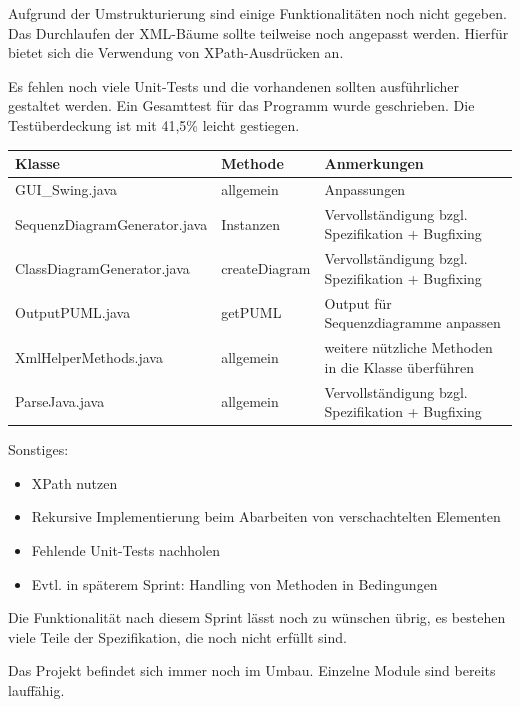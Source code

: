 Aufgrund der Umstrukturierung sind einige Funktionalitäten noch nicht gegeben. Das Durchlaufen der XML-Bäume sollte teilweise noch angepasst werden. Hierfür bietet sich die Verwendung von XPath-Ausdrücken an.
\nsecend%

Es fehlen noch viele Unit-Tests und die vorhandenen sollten ausführlicher gestaltet werden.
Ein Gesamttest für das Programm wurde geschrieben.
Die Testüberdeckung ist mit 41,5\% leicht gestiegen.
\nsecend%

\begin{table}[H]

\begin{tabularx}{\textwidth}{ |l|l|X| }
\hline
\textbf{Klasse} & \textbf{Methode} & \textbf{Anmerkungen}\\
 \hline
 GUI\_Swing.java & allgemein & Anpassungen\\
 \hline
 SequenzDiagramGenerator.java & Instanzen & Vervollständigung bzgl. Spezifikation + Bugfixing\\
 \hline
 ClassDiagramGenerator.java & createDiagram & Vervollständigung bzgl. Spezifikation + Bugfixing\\
 \hline
 OutputPUML.java & getPUML & Output für Sequenzdiagramme anpassen\\
 \hline
 XmlHelperMethods.java & allgemein & weitere nützliche Methoden in die Klasse überführen\\
 \hline
 ParseJava.java & allgemein & Vervollständigung bzgl. Spezifikation + Bugfixing\\
\hline
\end{tabularx}
\end{table}

Sonstiges:
\begin{itemize}
\item XPath nutzen
\item Rekursive Implementierung beim Abarbeiten von verschachtelten Elementen
\item Fehlende Unit-Tests nachholen
\item Evtl. in späterem Sprint: Handling von Methoden in Bedingungen
\end{itemize}
\nsecend%

Die Funktionalität nach diesem Sprint lässt noch zu wünschen übrig, es bestehen viele Teile der Spezifikation, die noch nicht erfüllt sind.
\nsecend%

Das Projekt befindet sich immer noch im Umbau. Einzelne Module sind bereits lauffähig.
\nsecend%